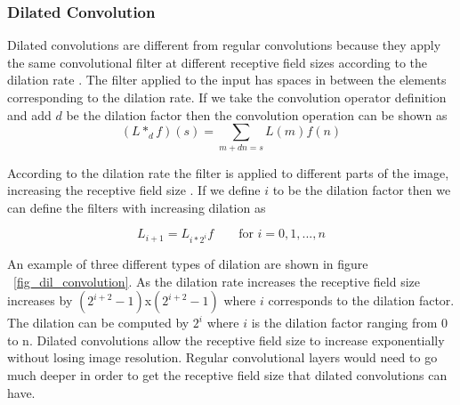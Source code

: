 \subsubsection{Dilated Convolution}
    Dilated convolutions are different from regular convolutions because they apply the same convolutional filter at different receptive field sizes according to the dilation rate \cite{Yu2016MultiScaleCA}.
    The filter applied to the input has spaces in between the elements corresponding to the dilation rate.
    If we take the convolution operator definition and add $d$ be the dilation factor then the convolution operation can be shown as 
\begin{equation}
 (L *_d f)(s) = \sum_{m+dn=s} L(m)f(n)\label{eq:dilconvolution}
\end{equation}

     According to the dilation rate the filter is applied to different parts of the image, increasing the receptive field size \cite{DBLP:journals/corr/ChenPSA17}. 
     If we define $i$ to be the dilation factor then we can define the filters with increasing dilation as
    
\begin{equation}
 L_{i+1} = L_{i*2^i} f \qquad \mbox{for   } i = 0,1,...,n\label{eq:dilatedrate} 
\end{equation}
    
    An example of three different types of dilation are shown in figure ~\ref{fig_dil_convolution}.
    As the dilation rate increases the receptive field size increases by $(2^{i+2}-1)$x$(2^{i+2}-1)$ where $i$ corresponds to the dilation factor.
    The dilation can be computed by $2^i$ where $i$ is the dilation factor ranging from 0 to n. 
    Dilated convolutions allow the receptive field size to increase exponentially without losing image resolution.
    Regular convolutional layers would need to go much deeper in order to get the receptive field size that dilated convolutions can have.
    

